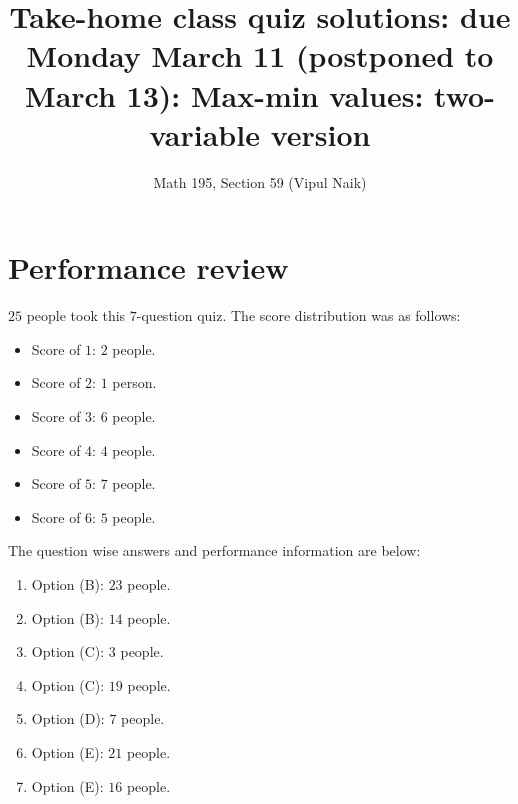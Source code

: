 \documentclass[10pt]{amsart}
\title{Take-home class quiz solutions: due Monday March 11 (postponed to March 13): Max-min values: two-variable version}
\author{Math 195, Section 59 (Vipul Naik)}
\begin{document}
\maketitle

\section{Performance review}

$25$ people took this $7$-question quiz. The score distribution was as
follows:

\begin{itemize}
\item Score of $1$: $2$ people.
\item Score of $2$: $1$ person.
\item Score of $3$: $6$ people.
\item Score of $4$: $4$ people.
\item Score of $5$: $7$ people.
\item Score of $6$: $5$ people.
\end{itemize}
The question wise answers and performance information are below:

\begin{enumerate}
\item Option (B): $23$ people.
\item Option (B): $14$ people.
\item Option (C): $3$ people.
\item Option (C): $19$ people.
\item Option (D): $7$ people.
\item Option (E): $21$ people.
\item Option (E): $16$ people.
\end{enumerate}
\end{document}
